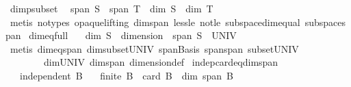 \begin{isabellebody}
\endisatagproof
{\isafoldproof}%
%
\isadelimproof
\isanewline
%
\endisadelimproof
\isanewline
{}\isamarkupfalse%
\ dim{\isacharunderscore}{\kern0pt}psubset{\isacharcolon}{\kern0pt}\isanewline
\ \ {\isachardoublequoteopen}span\ S\ {\isasymsubset}\ span\ T\ {\isasymLongrightarrow}\ dim\ S\ {\isacharless}{\kern0pt}\ dim\ T{\isachardoublequoteclose}\isanewline
%
\isadelimproof
\ \ %
\endisadelimproof
%
\isatagproof
{}\isamarkupfalse%
\ {\isacharparenleft}{\kern0pt}metis\ {\isacharparenleft}{\kern0pt}no{\isacharunderscore}{\kern0pt}types{\isacharcomma}{\kern0pt}\ opaque{\isacharunderscore}{\kern0pt}lifting{\isacharparenright}{\kern0pt}\ dim{\isacharunderscore}{\kern0pt}span\ less{\isacharunderscore}{\kern0pt}le\ not{\isacharunderscore}{\kern0pt}le\ subspace{\isacharunderscore}{\kern0pt}dim{\isacharunderscore}{\kern0pt}equal\ subspace{\isacharunderscore}{\kern0pt}span{\isacharparenright}{\kern0pt}%
\endisatagproof
{\isafoldproof}%
%
\isadelimproof
\isanewline
%
\endisadelimproof
\isanewline
{}\isamarkupfalse%
\ dim{\isacharunderscore}{\kern0pt}eq{\isacharunderscore}{\kern0pt}full{\isacharcolon}{\kern0pt}\isanewline
\ \ \ {\isachardoublequoteopen}dim\ S\ {\isacharequal}{\kern0pt}\ dimension\ {\isasymlongleftrightarrow}\ span\ S\ {\isacharequal}{\kern0pt}\ UNIV{\isachardoublequoteclose}\isanewline
%
\isadelimproof
\ \ %
\endisadelimproof
%
\isatagproof
{}\isamarkupfalse%
\ {\isacharparenleft}{\kern0pt}metis\ dim{\isacharunderscore}{\kern0pt}eq{\isacharunderscore}{\kern0pt}span\ dim{\isacharunderscore}{\kern0pt}subset{\isacharunderscore}{\kern0pt}UNIV\ span{\isacharunderscore}{\kern0pt}Basis\ span{\isacharunderscore}{\kern0pt}span\ subset{\isacharunderscore}{\kern0pt}UNIV\isanewline
\ \ \ \ \ \ \ \ dim{\isacharunderscore}{\kern0pt}UNIV\ dim{\isacharunderscore}{\kern0pt}span\ dimension{\isacharunderscore}{\kern0pt}def{\isacharparenright}{\kern0pt}%
\endisatagproof
{\isafoldproof}%
%
\isadelimproof
\isanewline
%
\endisadelimproof
\isanewline
{}\isamarkupfalse%
\ indep{\isacharunderscore}{\kern0pt}card{\isacharunderscore}{\kern0pt}eq{\isacharunderscore}{\kern0pt}dim{\isacharunderscore}{\kern0pt}span{\isacharcolon}{\kern0pt}\isanewline
\ \ \ {\isachardoublequoteopen}independent\ B{\isachardoublequoteclose}\isanewline
\ \ \ {\isachardoublequoteopen}finite\ B\ {\isasymand}\ card\ B\ {\isacharequal}{\kern0pt}\ dim\ {\isacharparenleft}{\kern0pt}span\ B{\isacharparenright}{\kern0pt}{\isachardoublequoteclose}\isanewline
%
\isadelimproof
\ \ %
\endisadelimproof

\end{isabellebody}
